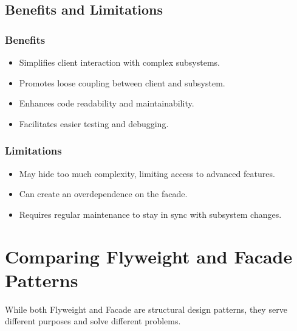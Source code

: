 \documentclass[12pt,a4paper]{article}
\begin{document}
\subsection{Benefits and Limitations}
\subsubsection{Benefits}
\begin{itemize}
    \item Simplifies client interaction with complex subsystems.
    \item Promotes loose coupling between client and subsystem.
    \item Enhances code readability and maintainability.
    \item Facilitates easier testing and debugging.
\end{itemize}

\subsubsection{Limitations}
\begin{itemize}
    \item May hide too much complexity, limiting access to advanced features.
    \item Can create an overdependence on the facade.
    \item Requires regular maintenance to stay in sync with subsystem changes.
\end{itemize}

\section{Comparing Flyweight and Facade Patterns}
While both Flyweight and Facade are structural design patterns, they serve different purposes and solve different problems.
\end{document}
